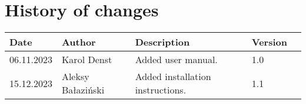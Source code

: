 \section{History of changes}
\begin{table}[H]
    \centering
    \begin{tabular}{lllll}
        \hline
        Date       & Author                                                                  & Description                          & Version & \\ \hline
        06.11.2023 & Karol Denst                                                             & Added user manual.                   & 1.0     & \\
        15.12.2023 & Aleksy Bałaziński                                                       & Added installation instructions.     & 1.1     & \\ \hline
    \end{tabular}
\end{table}